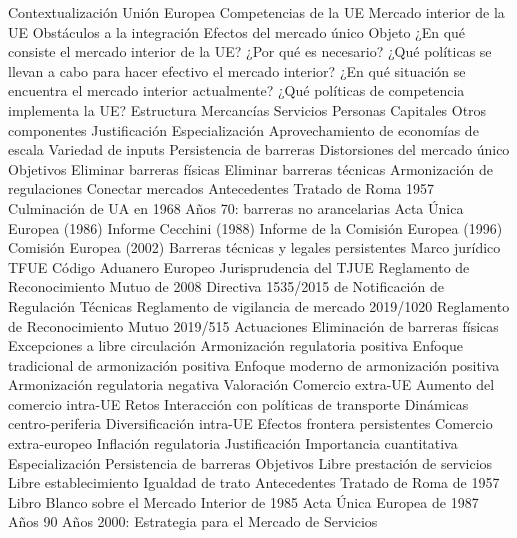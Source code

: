 \documentclass{nuevotema}
\begin{document}
\begin{esquema}[enumerate]
	\1[] 
		\2 Contextualización
			\3 Unión Europea
			\3 Competencias de la UE
			\3 Mercado interior de la UE
			\3 Obstáculos a la integración
			\3 Efectos del mercado único
		\2 Objeto
			\3 ¿En qué consiste el mercado interior de la UE?
			\3 ¿Por qué es necesario?
			\3 ¿Qué políticas se llevan a cabo para hacer efectivo el mercado interior?
			\3 ¿En qué situación se encuentra el mercado interior actualmente?
			\3 ¿Qué políticas de competencia implementa la UE?
		\2 Estructura
			\3 Mercancías
			\3 Servicios
			\3 Personas
			\3 Capitales
			\3 Otros componentes
	\1 
		\2 Justificación
			\3 Especialización
			\3 Aprovechamiento de economías de escala
			\3 Variedad de inputs
			\3 Persistencia de barreras
			\3 Distorsiones del mercado único
		\2 Objetivos
			\3 Eliminar barreras físicas
			\3 Eliminar barreras técnicas
			\3 Armonización de regulaciones
			\3 Conectar mercados
		\2 Antecedentes
			\3 Tratado de Roma 1957
			\3 Culminación de UA en 1968
			\3 Años 70: barreras no arancelarias
			\3 Acta Única Europea (1986)
			\3 Informe Cecchini (1988)
			\3 Informe de la Comisión Europea (1996)
			\3 Comisión Europea (2002)
			\3 Barreras técnicas y legales persistentes
		\2 Marco jurídico
			\3 TFUE
			\3 Código Aduanero Europeo
			\3 Jurisprudencia del TJUE
			\3 Reglamento de Reconocimiento Mutuo de 2008
			\3 Directiva 1535/2015 de Notificación de Regulación Técnicas
			\3 Reglamento de vigilancia de mercado 2019/1020
			\3 Reglamento de Reconocimiento Mutuo 2019/515
		\2 Actuaciones
			\3 Eliminación de barreras físicas
			\3 Excepciones a libre circulación
			\3 Armonización regulatoria positiva
			\3 Enfoque tradicional de armonización positiva
			\3 Enfoque moderno de armonización positiva
			\3 Armonización regulatoria negativa
		\2 Valoración
			\3 Comercio extra-UE
			\3 Aumento del comercio intra-UE
		\2 Retos
			\3 Interacción con políticas de transporte
			\3 Dinámicas centro-periferia
			\3 Diversificación intra-UE
			\3 Efectos frontera persistentes
			\3 Comercio extra-europeo
			\3 Inflación regulatoria
	\1 
		\2 Justificación
			\3 Importancia cuantitativa
			\3 Especialización
			\3 Persistencia de barreras
		\2 Objetivos
			\3 Libre prestación de servicios
			\3 Libre establecimiento
			\3 Igualdad de trato
		\2 Antecedentes
			\3 Tratado de Roma de 1957
			\3 Libro Blanco sobre el Mercado Interior de 1985
			\3 Acta Única Europea de 1987
			\3 Años 90
			\3 Años 2000: Estrategia para el Mercado de Servicios

\end{esquema}
\end{document}
